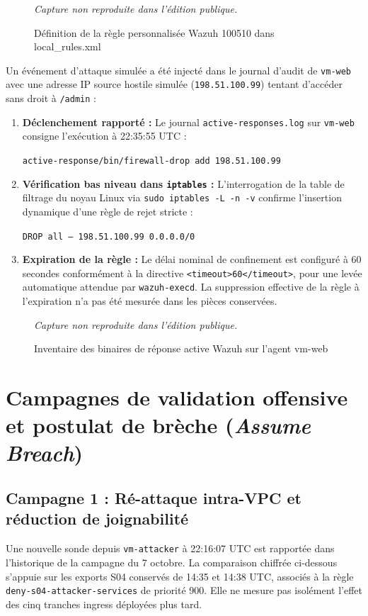\documentclass[a4paper,12pt]{report}
\newcommand{\publiccapture}[1]{%
  \begin{figure}[H]\centering
  {\footnotesize\itshape Capture non reproduite dans l'édition publique.}
  \caption{#1}\end{figure}}
\begin{document}
\publiccapture{Définition de la règle personnalisée Wazuh 100510 dans local\_rules.xml}

Un événement d'attaque simulée a été injecté dans le journal d'audit de \texttt{vm-web} avec une adresse IP source hostile simulée (\texttt{198.51.100.99}) tentant d'accéder sans droit à \texttt{/admin} :
\begin{enumerate}
\item \textbf{Déclenchement rapporté :} Le journal \texttt{active-responses.log} sur \texttt{vm-web} consigne l'exécution à 22:35:55 UTC :
\begin{center}\small\texttt{active-response/bin/firewall-drop add 198.51.100.99}\end{center}
\item \textbf{Vérification bas niveau dans \texttt{iptables} :} L'interrogation de la table de filtrage du noyau Linux via \texttt{sudo iptables -L -n -v} confirme l'insertion dynamique d'une règle de rejet stricte :
\begin{center}\small\texttt{DROP all -- 198.51.100.99 0.0.0.0/0}\end{center}
\item \textbf{Expiration de la règle :} Le délai nominal de confinement est configuré à 60 secondes conformément à la directive \texttt{<timeout>60</timeout>}, pour une levée automatique attendue par \texttt{wazuh-execd}. La suppression effective de la règle à l'expiration n'a pas été mesurée dans les pièces conservées.
\end{enumerate}

\publiccapture{Inventaire des binaires de réponse active Wazuh sur l'agent vm-web}

\section{Campagnes de validation offensive et postulat de brèche (\textit{Assume Breach})}
\label{sec:p4-offensive}
\subsection{Campagne 1 : Ré-attaque intra-VPC et réduction de joignabilité}
Une nouvelle sonde depuis \texttt{vm-attacker} à 22:16:07 UTC est rapportée dans l'historique de la campagne du 7 octobre. La comparaison chiffrée ci-dessous s'appuie sur les exports S04 conservés de 14:35 et 14:38 UTC, associés à la règle \texttt{deny-s04-attacker-services} de priorité 900. Elle ne mesure pas isolément l'effet des cinq tranches ingress déployées plus tard.
\end{document}
